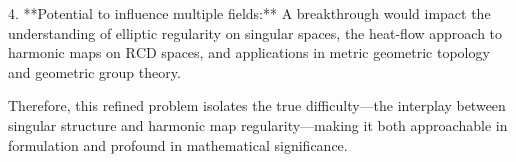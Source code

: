 4. **Potential to influence multiple fields:**  
   A breakthrough would impact the understanding of elliptic regularity on singular spaces, the heat-flow approach to harmonic maps on \(\mathrm{RCD}\) spaces, and applications in metric geometric topology and geometric group theory.

Therefore, this refined problem isolates the true difficulty—the interplay between singular structure and harmonic map regularity—making it both approachable in formulation and profound in mathematical significance.